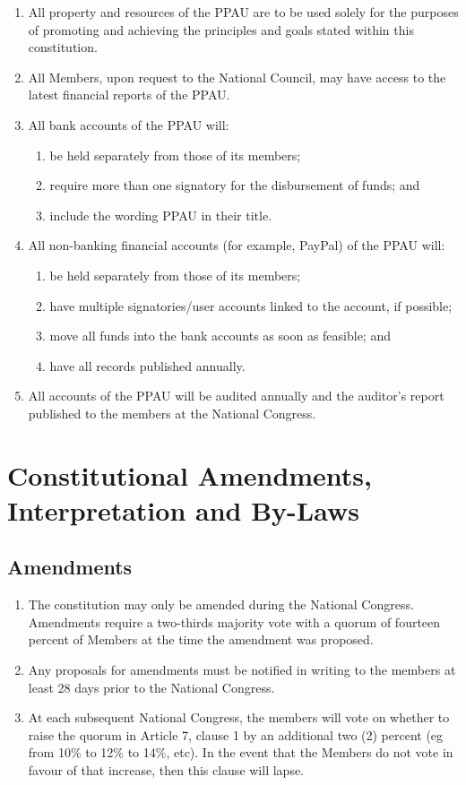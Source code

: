 \documentclass[a4paper,titlepage,8.5pt]{article}
\begin{document}
\begin{enumerate}
\item All property and resources of the PPAU are to be used solely for the purposes of promoting and achieving the principles and goals stated within this constitution.
\item All Members, upon request to the National Council, may have access to the latest financial reports of the PPAU.
\item All bank accounts of the PPAU will:
\begin{enumerate}
\item be held separately from those of its members;
\item require more than one signatory for the disbursement of funds; and 
\item include the wording PPAU in their title.
\end{enumerate}
\item All non-banking financial accounts (for example, PayPal) of the PPAU will:
\begin{enumerate}
\item be held separately from those of its members;
\item have multiple signatories/user accounts linked to the account, if possible;
\item move all funds into the bank accounts as soon as feasible; and
\item have all records published annually.
\end{enumerate}
\item All accounts of the PPAU will be audited annually and the auditor’s report published to the members at the National Congress.
\end{enumerate}

\section{Constitutional Amendments, Interpretation and By-Laws}

\subsection{Amendments}

\begin{enumerate}
\item The constitution may only be amended during the National Congress. Amendments require a two-thirds majority vote with a quorum of fourteen percent of Members at the time the amendment was proposed.
\item Any proposals for amendments must be notified in writing to the members at least 28 days prior to the National Congress.
\item At each subsequent National Congress, the members will vote on whether to raise the quorum in Article 7, clause 1 by an additional two (2) percent (eg from 10\% to 12\% to 14\%, etc). In the event that the Members do not vote in favour of that increase, then this clause will lapse.
\end{enumerate}
\end{document}
